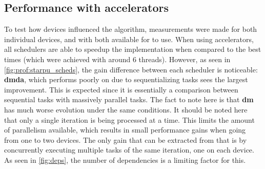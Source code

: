 \documentclass[main.tex]{subfiles}
\begin{document}
\subsection{Performance with accelerators}

To test how \cuda devices influenced the algorithm, measurements were made for both individual \cuda devices, and with both available \gpus for \starpu to use.
When using accelerators, all schedulers are able to speedup the implementation when compared to the best \cpu times (which were achieved with around 6 threads). However, as seen in \cref{fig:prof:starpu_scheds}, the gain difference between each scheduler is noticeable: \textbf{dmda}, which performs poorly on \cpu due to sequentializing tasks sees the largest improvement. This is expected since it is essentially a comparison between sequential \cpu tasks with massively parallel \cuda tasks. The fact to note here is that \textbf{dm} has much worse evolution under the same conditions.
It should be noted here that only a single iteration is being processed at a time. This limits the amount of parallelism available, which results in small performance gains when going from one to two \cuda devices. The only gain that can be extracted from that is by concurrently executing multiple tasks of the same iteration, one on each device. As seen in \cref{fig:deps}, the number of dependencies is a limiting factor for this.
\end{document}
